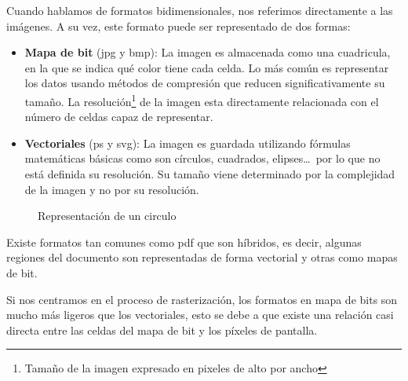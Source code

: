 Cuando hablamos de formatos bidimensionales, nos referimos directamente a las imágenes. A su vez, este formato puede ser representado de dos formas:

\begin{itemize}
\item \textbf{Mapa de bit} (jpg y bmp): La imagen es almacenada como una cuadricula, en la que se indica qué color tiene cada celda. Lo más común es representar los datos usando métodos de compresión que reducen significativamente su tamaño. La resolución\footnote{Tamaño de la imagen expresado en pixeles de alto por ancho} de la imagen esta directamente relacionada con el número de celdas capaz de representar. 
\item \textbf{Vectoriales} (ps y svg): La imagen es guardada utilizando fórmulas matemáticas básicas como son círculos, cuadrados, elipses\ldots\ por lo que no está definida su resolución. Su tamaño viene determinado por la complejidad de la imagen y no por su resolución.
\end{itemize}

\begin{figure}[h]
	\centering	
	\caption{Representación de un circulo}
\end{figure}

Existe formatos tan comunes como pdf que son híbridos, es decir, algunas regiones del documento son representadas de forma vectorial y otras como mapas de bit.
\newpage

Si nos centramos en el proceso de rasterización, los formatos en mapa de bits son mucho más ligeros que los vectoriales, esto se debe a que existe una relación casi directa entre las celdas del mapa de bit y los píxeles de pantalla. 
\newline 

